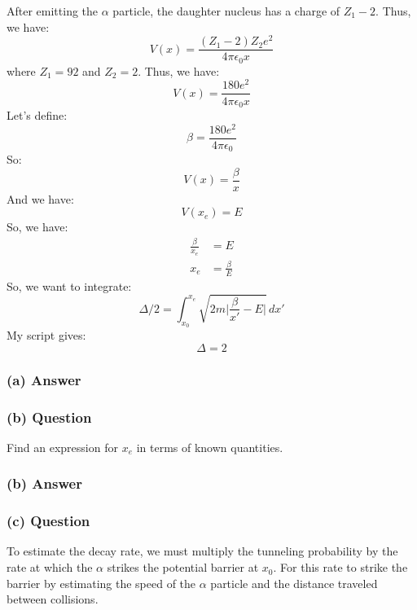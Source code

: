 \documentclass{article}
\begin{document}
After emitting the \( \alpha \) particle, the daughter nucleus has a charge of \( Z_1 - 2 \). Thus, we have:
\begin{equation}
    V(x) = \frac{(Z_1 - 2)Z_2e^2}{4\pi \epsilon_0 x}
\end{equation}
where \( Z_1 = 92 \) and \( Z_2 = 2 \). Thus, we have:
\begin{equation}
    V(x) = \frac{180e^2}{4\pi \epsilon_0 x}
\end{equation}
Let's define:
\begin{equation}
    \beta = \frac{180e^2}{4\pi \epsilon_0}
\end{equation}
So:
\begin{equation}
    V(x) = \frac{\beta}{x}
\end{equation}
And we have:
\begin{equation}
    V(x_e) = E
\end{equation}
So, we have:
\begin{align}
    \frac{\beta}{x_e} &= E \\
    x_e &= \frac{\beta}{E}
\end{align}
So, we want to integrate:
\begin{equation}
    \Delta/2 = \int_{x_0}^{x_e} \sqrt{2m\lvert \frac{\beta}{x'} - E \rvert}\,dx'
\end{equation}
My script gives:
\begin{equation}
    \Delta = 2
\end{equation}
\subsubsection*{(a) Answer}

\subsubsection*{(b) Question}
Find an expression for \( x_e \) in terms of known quantities.

\subsubsection*{(b) Answer}

\subsubsection*{(c) Question}
To estimate the decay rate, we must multiply the tunneling probability by the rate at which the \( \alpha \) strikes the potential barrier at \( x_0 \). For this rate to strike the barrier by estimating the speed of the \( \alpha \) particle and the distance traveled between collisions.
\end{document}
